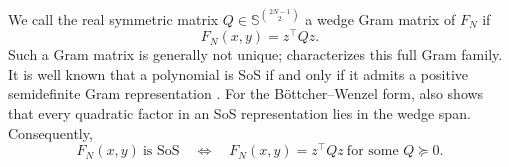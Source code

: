 We call the real symmetric matrix $Q\in\mathbb S^{\binom{2N-1}{2}}$ a wedge Gram matrix of $F_N$ if
$$
        F_N(x,y)=z^\top Qz.
$$
Such a Gram matrix is generally not unique;  characterizes this full Gram family.
It is well known that a polynomial is SoS if and only if it admits a positive semidefinite Gram representation \cite{parrilo2000structured,lasserre2001global}. For the B\"ottcher--Wenzel form,  also shows that every quadratic factor in an SoS representation lies in the wedge span. Consequently,
$$
        F_N(x,y)\ \text{is SoS}
        \quad\Longleftrightarrow\quad
        F_N(x,y)=z^\top Qz
        \ \text{for some }Q\succeq0.
$$



